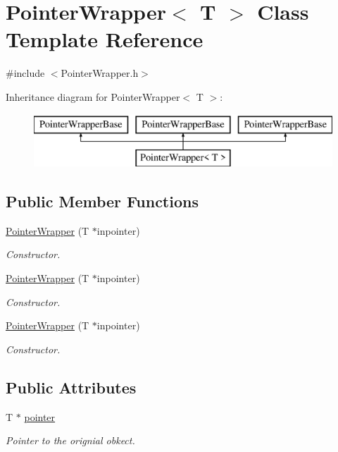 \hypertarget{classPointerWrapper}{\section{Pointer\-Wrapper$<$ T $>$ Class Template Reference}
\label{classPointerWrapper}
}


{\ttfamily \#include $<$Pointer\-Wrapper.\-h$>$}

Inheritance diagram for Pointer\-Wrapper$<$ T $>$\-:\begin{figure}[H]
\begin{center}
\leavevmode
\includegraphics[height=2.000000cm]{classPointerWrapper}
\end{center}
\end{figure}
\subsection*{Public Member Functions}
\begin{DoxyCompactItemize}
\item 
\hyperlink{classPointerWrapper_aa645eb1963f91c9bddf5fd6ff578751b}{Pointer\-Wrapper} (T $\ast$inpointer)
\begin{DoxyCompactList}\small\item\em Constructor. \end{DoxyCompactList}\item 
\hyperlink{classPointerWrapper_aa645eb1963f91c9bddf5fd6ff578751b}{Pointer\-Wrapper} (T $\ast$inpointer)
\begin{DoxyCompactList}\small\item\em Constructor. \end{DoxyCompactList}\item 
\hyperlink{classPointerWrapper_aa645eb1963f91c9bddf5fd6ff578751b}{Pointer\-Wrapper} (T $\ast$inpointer)
\begin{DoxyCompactList}\small\item\em Constructor. \end{DoxyCompactList}\end{DoxyCompactItemize}
\subsection*{Public Attributes}
\begin{DoxyCompactItemize}
\item 
\hypertarget{classPointerWrapper_a29dd2322a9af40091b565a33d62afad4}{T $\ast$ \hyperlink{classPointerWrapper_a29dd2322a9af40091b565a33d62afad4}{pointer}}\label{classPointerWrapper_a29dd2322a9af40091b565a33d62afad4}

\begin{DoxyCompactList}\small\item\em Pointer to the orignial obkect. \end{DoxyCompactList}\end{DoxyCompactItemize}


